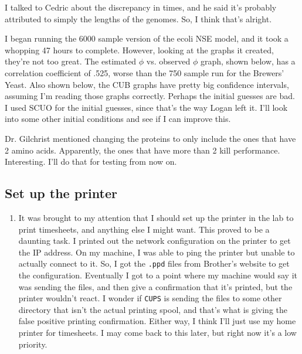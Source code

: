 \documentclass[12 pt]{article}
\begin{document}
\begin{enumerate}
				I talked to Cedric about the discrepancy in times, and he said it's probably attributed to simply the lengths of the genomes. So, I think that's alright.
				
				I began running the 6000 sample version of the ecoli NSE model, and it took a whopping 47 hours to complete. However, looking at the graphs it created, they're not too great. The estimated $ \phi $ vs. observed $ \phi $ graph, shown below, has a correlation coefficient of .525, worse than the 750 sample run for the Brewers' Yeast. Also shown below, the CUB graphs have pretty big confidence intervals, assuming I'm reading those graphs correctly. Perhaps the initial guesses are bad. I used SCUO for the initial guesses, since that's the way Logan left it. I'll look into some other initial conditions and see if I can improve this.
				
				
				
				
				
				Dr. Gilchrist mentioned changing the proteins to only include the ones that have 2 amino acids. Apparently, the ones that have more than 2 kill performance. Interesting. I'll do that for testing from now on.
				
				
 			\end{enumerate} 
 			
 		\subsection{Set up the printer}
 		\begin{enumerate}
		 	\item It was brought to my attention that I should set up the printer in the lab to print timesheets, and anything else I might want. This proved to be a daunting task. I printed out the network configuration on the printer to get the IP address. On my machine, I was able to ping the printer but unable to actually connect to it. So, I got the \texttt{.ppd} files from Brother's website to get the configuration. Eventually I got to a point where my machine would say it was sending the files, and then give a confirmation that it's printed, but the printer wouldn't react. I wonder if \texttt{CUPS} is sending the files to some other directory that isn't the actual printing spool, and that's what is giving the false positive printing confirmation. Either way, I think I'll just use my home printer for timesheets. I may come back to this later, but right now it's a low priority.
 		\end{enumerate}
 		
\end{document}
